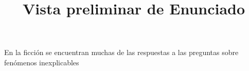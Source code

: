 \documentclass[a4paper,12pt]{article}\usepackage[utf8]{inputenc}\usepackage[spanish]{babel}\usepackage{times}
\title{Vista preliminar de Enunciado}
\begin{document}
\twocolumn 

\maketitle

En la ficción se encuentran muchas de las respuestas a las preguntas sobre fenómenos inexplicables 
\end{document}
